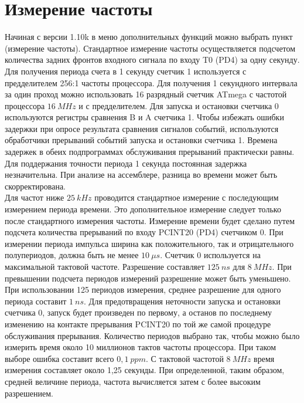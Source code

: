 
\section{Измерение частоты}
\label{sec:frequency}

Начиная с версии 1.10k в меню дополнительных функций можно выбрать пункт  (измерение частоты). 
Стандартное измерение частоты осуществляется подсчетом количества задних фронтов входного сигнала по входу 
T0 (PD4) за одну секунду. Для получения периода счета в 1 секунду счетчик 1 используется с 
предделителем 256:1 частоты процессора.  
Для получения 1 секундного интервала за один проход можно использовать 16 разрядный счетчик ATmega 
с частотой процессора \(16~MHz\) и с предделителем.
Для запуска и остановки счетчика 0 используются регистры сравнения B и A счетчика 1. Чтобы избежать 
ошибки задержки при опросе результата сравнения сигналов событий, используются обработчики прерываний 
событий запуска и остановки счетчика 1. Времена задержек в обеих подпрограммах обслуживания прерываний 
практически равны. Для поддержания точности периода 1 секунда постоянная задержка незначительна. 
При анализе на ассемблере, разница во времени может быть скорректирована.\\

Для частот ниже \(25~kHz\) проводится стандартное измерение с последующим измерением периода времени. 
Это дополнительное измерение следует только после стандартного измерения частоты. Измерение времени 
будет сделано путем подсчета количества прерываний по входу PCINT20 (PD4) счетчиком 0.
При измерении периода импульса ширина как положительного, так и отрицательного полупериодов, 
должна быть не менее \(10~\mu s\).  
Счетчик 0 используется на максимальной тактовой частоте. Разрешение составляет  \(125~ns\) для
\(8~MHz\). При превышении подсчета периодов измерений разрешение может быть уменьшено. 
При использовании 125 периодов измерения, среднее разрешение для одного периода составит \(1~ns\). 
Для предотвращения неточности запуска и остановки счетчика 0, запуск будет
произведен по первому, а останов по последнему изменению на контакте прерывания PCINT20 по той же 
самой процедуре обслуживания прерывания. Количество периодов выбрано так, чтобы можно было измерить 
время около 10 миллионов тактов частоты процессора. При таком выборе ошибка составит 
всего \(0,1~ppm\). С тактовой частотой \(8~MHz\) время измерения составляет около 1,25 секунды. 
При определенной, таким образом, средней величине периода, частота вычисляется 
затем с более высоким разрешением.\\

